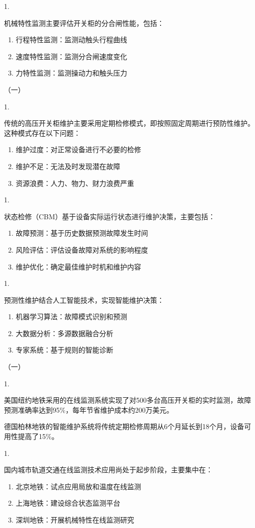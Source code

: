 1.

机械特性监测主要评估开关柜的分合闸性能，包括：
\begin{enumerate}
    \item 行程特性监测：监测动触头行程曲线
    \item 速度特性监测：监测分合闸速度变化
    \item 力特性监测：监测操动力和触头压力
\end{enumerate}

（一）

1.

传统的高压开关柜维护主要采用定期检修模式，即按照固定周期进行预防性维护。这种模式存在以下问题：
\begin{enumerate}
    \item 维护过度：对正常设备进行不必要的检修
    \item 维护不足：无法及时发现潜在故障
    \item 资源浪费：人力、物力、财力浪费严重
\end{enumerate}

1.

状态检修（CBM）基于设备实际运行状态进行维护决策，主要包括：
\begin{enumerate}
    \item 故障预测：基于历史数据预测故障发生时间
    \item 风险评估：评估设备故障对系统的影响程度
    \item 维护优化：确定最佳维护时机和维护内容
\end{enumerate}

1.

预测性维护结合人工智能技术，实现智能维护决策：
\begin{enumerate}
    \item 机器学习算法：故障模式识别和预测
    \item 大数据分析：多源数据融合分析
    \item 专家系统：基于规则的智能诊断
\end{enumerate}

（一）

1.

美国纽约地铁采用的在线监测系统实现了对500多台高压开关柜的实时监测，故障预测准确率达到95\%，每年节省维护成本约200万美元。

德国柏林地铁的智能维护系统将传统定期检修周期从6个月延长到18个月，设备可用性提高了15\%。

1.

国内城市轨道交通在线监测技术应用尚处于起步阶段，主要集中在：
\begin{enumerate}
    \item 北京地铁：试点应用局放和温度在线监测
    \item 上海地铁：建设综合状态监测平台
    \item 深圳地铁：开展机械特性在线监测研究
\end{enumerate}

